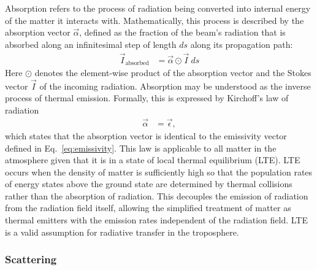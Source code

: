 Absorption refers to the process of radiation being converted into internal
energy of the matter it interacts with. Mathematically, this process is
described by the absorption vector $\vec{\alpha}$, defined as the fraction of
the beam's radiation that is absorbed along an infinitesimal step of length $ds$
along its propagation path:
\begin{align}
\vec{I}_\text{absorbed} &= \vec{\alpha} \odot \vec{I} \ ds
\end{align}
Here $\odot$ denotes the element-wise product of the absorption vector and
the Stokes vector $\vec{I}$ of the incoming radiation. Absorption may be
understood as the inverse process of thermal emission. Formally, this is
expressed by Kirchoff's  law of radiation
\begin{align}
  \vec{\alpha} &= \vec{\epsilon},
\end{align}
which states that the absorption vector is identical to the emissivity vector
defined in Eq.~\ref{eq:emissivity}. This law is applicable to all matter in the
atmosphere given that it is in a state of local thermal equilibrium (LTE). LTE
occurs when the density of matter is sufficiently high so that the population
rates of energy states above the ground state are determined by thermal
collisions rather than the absorption of radiation. This decouples the emission
of radiation from the radiation field itself, allowing the simplified treatment
of matter as thermal emitters with the emission rates independent of the
radiation field. LTE is a valid assumption for radiative transfer in the
troposphere.

\subsubsection{Scattering}

